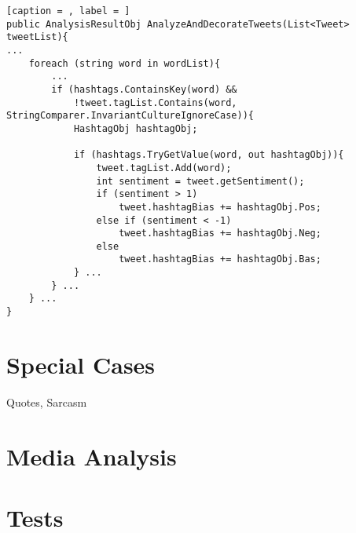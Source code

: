 \begin{minipage}[H]{\linewidth}
\begin{lstlisting}[caption = , label = ] 
public AnalysisResultObj AnalyzeAndDecorateTweets(List<Tweet> tweetList){
...
	foreach (string word in wordList){
		...
		if (hashtags.ContainsKey(word) && 
			!tweet.tagList.Contains(word, StringComparer.InvariantCultureIgnoreCase)){
        	HashtagObj hashtagObj;
			
			if (hashtags.TryGetValue(word, out hashtagObj)){
            	tweet.tagList.Add(word);
				int sentiment = tweet.getSentiment();
                if (sentiment > 1)
	                tweet.hashtagBias += hashtagObj.Pos;
                else if (sentiment < -1)
    	            tweet.hashtagBias += hashtagObj.Neg;
                else
        	        tweet.hashtagBias += hashtagObj.Bas;
            } ...
    	} ...
	} ...
}
\end{lstlisting}
\end{minipage}

\section{Special Cases}
Quotes, Sarcasm

\section{Media Analysis}


\section{Tests}